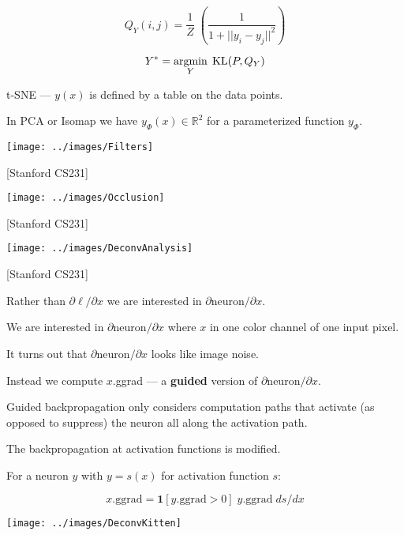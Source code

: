 {\vfill
$$Q_Y(i,j) = \frac{1}{Z}\;\left(\frac{1}{1 + ||y_i -y_j||^2}\right)$$

\vfill
$$Y^* = \operatorname*{argmin}_Y \;\mathrm{KL}(P,Q_Y)$$


t-SNE --- $y(x)$ is defined by a table on the data points.

\vfill
In PCA or Isomap we have $y_\Phi(x) \in \mathbb{R}^2$ for a parameterized function $y_\Phi$.


\centerline{\texttt{[image: ../images/Filters]}}
\centerline{[Stanford CS231]}

\slide{}

\centerline{\texttt{[image: ../images/Occlusion]}}
\centerline{[Stanford CS231]}


\centerline{\texttt{[image: ../images/DeconvAnalysis]}}
\centerline{[Stanford CS231]}


Rather than $\partial \ell/ \partial x$ we are interested in $\partial \mathrm{neuron}/\partial x$.

\vfill
We are interested in $\partial \mathrm{neuron}/\partial x$ where $x$ in one color channel of one input pixel.

\vfill
It turns out that $\partial \mathrm{neuron}/\partial x$ looks like image noise.

\vfill
Instead we compute $x$.ggrad  --- a {\bf guided} version of $\partial \mathrm{neuron}/\partial x$.


\vfill
Guided backpropagation only considers computation paths that activate (as opposed to suppress) the neuron all along the activation path.

\vfill
The backpropagation at activation functions is modified.

\vfill
For a neuron $y$ with $y = s(x)$ for activation function $s$:

$$x.\mathrm{ggrad} = \mathbf{1}[y.\mathrm{ggrad} > 0] \;y.\mathrm{ggrad}\; ds/dx$$



\centerline{\texttt{[image: ../images/DeconvKitten]}}


}
